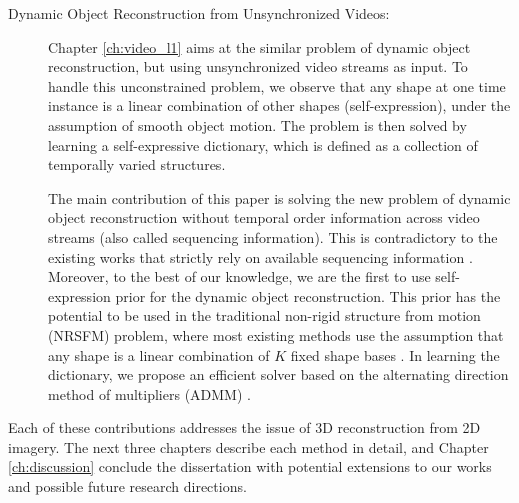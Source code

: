 \begin{description}
\item[Dynamic Object Reconstruction from Unsynchronized Videos:]
Chapter \ref{ch:video_l1} aims at the similar problem of dynamic object reconstruction, but using unsynchronized video streams as input. To handle this unconstrained problem, we observe that any shape at one time instance is a linear combination of other shapes (self-expression), under the assumption of smooth object motion. The problem is then solved by learning a self-expressive dictionary, which is defined as a collection of temporally varied structures. 

The main contribution of this paper is solving the new problem of dynamic object reconstruction without temporal order information across video streams (also called sequencing information). This is contradictory to the existing works that strictly rely on available sequencing information \cite{Park_ECCV2010,Valmadre_CVPR2012}. 
Moreover, to the best of our knowledge, we are the first to use self-expression prior for the dynamic object reconstruction. This prior has the potential to be used in the traditional non-rigid structure from motion (NRSFM) problem, where most existing methods use the assumption that any shape is a linear combination of $K$ fixed shape bases \cite{dai2014simple,Bregler_CVPR2000}. In learning the dictionary, we propose an efficient solver based on the alternating direction method of multipliers (ADMM) \cite{boyd2011distributed}.

\end{description}

Each of these contributions addresses the issue of 3D reconstruction from 2D imagery. The next three chapters describe each method in detail, and Chapter \ref{ch:discussion} conclude the dissertation with potential extensions to our works and possible future research directions. 

